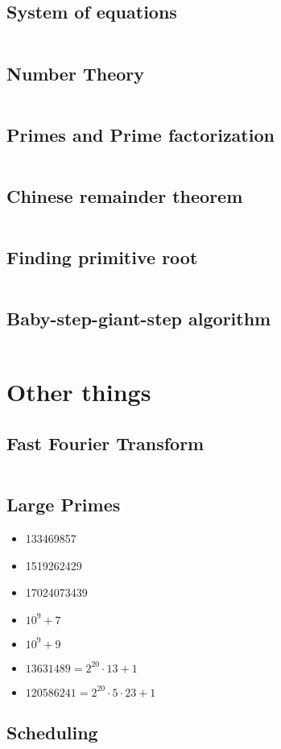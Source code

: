 \documentclass[8pt,a4paper,landscape,oneside]{amsart}
\newcommand{\codec}[1]{\inputminted[fontsize=\large,tabsize=2,baselinestretch=1]{cpp}{code/#1}}
\newcommand{\codep}[1]{\inputminted[fontsize=\large,tabsize=2,baselinestretch=1]{py}{code/#1}}
\begin{document}
\begin{multicols*}{2}
\begin{large}
\subsection{System of equations}
\codep{gaussianelimination.py}
\subsection{Number Theory}
\codep{gcdbezout.py}
\subsection{Primes and Prime factorization}
\codep{primecalc.py}
\subsection{Chinese remainder theorem}
\codep{crt.py}
\subsection{Finding primitive root}
\codep{primitiveroot.py}
\subsection{Baby-step-giant-step algorithm}
\codep{babystepgiantstep.py}
\section{Other things}
\subsection{Fast Fourier Transform}
\codec{fft.cpp}
\subsection{Large Primes}
\begin{itemize}
    \item 133469857
    \item 1519262429
    \item 17024073439
    \item $10^9+7$
    \item $10^9+9$
    \item $13631489 = 2^{20}\cdot 13 + 1$
    \item $120586241 = 2^{20}\cdot 5\cdot 23 + 1$
\end{itemize}
\subsection{Scheduling}
\codec{scheduling.cpp}

\end{large}
\end{multicols*}
\end{document}
